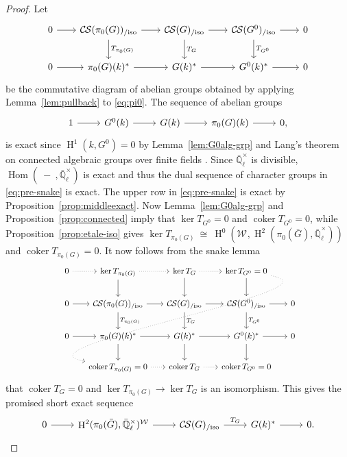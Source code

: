 \documentclass[10pt]{amsart}
\theoremstyle{plain}
\theoremstyle{definition}
\theoremstyle{remark}
\newcommand{\EE}{\mathbb{\bar Q}_\ell}
\newcommand{\Fq}{k}
\newcommand{\EEx}{\EE^\times}
\newcommand{\Weil}[1]{\mathcal{W}_{#1}}
\DeclareMathOperator{\Hom}{Hom}
\DeclareMathOperator{\coker}{coker}
\DeclareMathOperator{\Hh}{H}
\newcommand{\iso}{{\ \cong\ }}
\newcommand{\TrFrob}[1]{T_{#1}}
\newcommand{\CS}{{\mathcal{C\hskip-0.8pt S}}}
\newcommand{\CSiso}[1]{\CS(#1)_{/\text{iso}}}
\newcommand{\bG}{\bar{G}}
\begin{document}
\begin{proof}
  Let
  \begin{equation}\label{eq:pre-snake}
  \begin{tikzcd}[row sep=20, column sep=20]
    0 \rar & \CSiso{\pi_0(G)} \rar \dar{\TrFrob{\pi_0(G)}}
    & \CSiso{G} \rar \dar{\TrFrob{G}} & \CSiso{G^0} \rar \dar{\TrFrob{G^0}} & 0\\
    0 \rar & \pi_0(G)(\Fq)^* \rar
    &  G(\Fq)^* \rar & G^0(\Fq)^* \rar & 0
  \end{tikzcd}
  \end{equation}
  be the commutative diagram of abelian groups obtained by applying
  Lemma~\ref{lem:pullback} to \eqref{eq:pi0}.
  The sequence of abelian groups
\[
  \begin{tikzcd}
    1 \rar & G^0(\Fq) \rar & G(\Fq) \rar & \pi_0(G)(\Fq) \rar & 0,
  \end{tikzcd}
\]
  is exact since $\Hh^1(\Fq,G^0) =0$ by Lemma~\ref{lem:G0alg-grp} and Lang's theorem on connected algebraic groups over finite fields \cite{lang:56a}.
  Since $\EEx$ is divisible, $\Hom(\ - \ ,\EEx)$ is exact and thus the dual sequence of
  character groups in \eqref{eq:pre-snake} is exact.
%
  The upper row in \eqref{eq:pre-snake} is exact by Proposition~\ref{prop:middleexact}.
  Now Lemma~\ref{lem:G0alg-grp} and Proposition~\ref{prop:connected}
  imply that $\ker \TrFrob{G^0} =0$ and $\coker \TrFrob{G^0}=0$,
  while Proposition~\ref{prop:etale-iso} gives $\ker \TrFrob{\pi_0(G)} \iso \Hh^0(\Weil{},\Hh^2(\pi_0(\bG),\EEx))$
  and $\coker \TrFrob{\pi_0(G)}=0$.
It now follows from the snake lemma
 \begin{equation}\label{eq:snake}
  \begin{tikzcd}[row sep=20, column sep=15]
    0 \arrow[dotted]{r} & \ker \TrFrob{\pi_0(G)} \arrow[dotted]{r} \dar & \arrow{d} \ker \TrFrob{G} \arrow[dotted]{r} & \ker \TrFrob{G^0} =0 \arrow[dotted, out=-10, in=170]{dddll} \dar & \\
    0 \rar & \CSiso{\pi_0(G)} \rar \dar{\TrFrob{\pi_0(G)}}
    & \CSiso{G} \rar \dar{\TrFrob{G}} & \CSiso{G^0} \rar \dar{\TrFrob{G^0}} & 0\\
    0 \rar & \pi_0(G)(\Fq)^* \rar \dar
    & \arrow{d} G(\Fq)^* \rar & G^0(\Fq)^* \rar \dar & 0\\
   &  \coker \TrFrob{\pi_0(G)} =0 \arrow[dotted]{r} & \coker \TrFrob{G} \arrow[dotted]{r} & \coker \TrFrob{G^0} =0 & 
  \end{tikzcd}
  \end{equation}
that $\coker \TrFrob{G} =0$
and $\ker \TrFrob{\pi_0(G)} \to \ker \TrFrob{G}$ is an isomorphism.
This gives the promised short exact sequence
\[
  \begin{tikzcd}
0 \arrow{r} & \Hh^2(\pi_0(\bG),\EEx)^{\Weil{}} \arrow{r} & \CSiso{G} \arrow{r}{\TrFrob{G}} & G(\Fq)^* \arrow{r} & 0. 
  \end{tikzcd}
\]
\end{proof}
\end{document}

